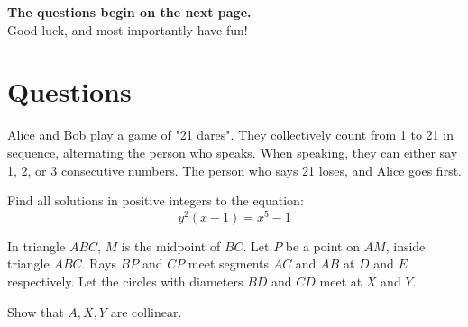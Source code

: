 \documentclass{exam}
\begin{document}
\centering

\textbf{The questions begin on the next page.}\\
\vspace{10pt}
Good luck, and most importantly have fun!



\newpage
\section*{Questions}
\vspace{20pt}

\begin{questions}
    \question[20]
    Alice and Bob play a game of "21 dares". They collectively count from 1 to 21 in sequence, alternating the person who speaks. When speaking, they can either say 1, 2, or 3 consecutive numbers. The person who says 21 loses, and Alice goes first.

    \question[40]
    Find all solutions in positive integers to the equation:
    \[ y^2(x-1) = x^5 - 1 \]

    \question[40]
    In triangle $ABC$, $M$ is the midpoint of $BC$. Let $P$ be a point on $AM$, inside triangle $ABC$.
    Rays $BP$ and $CP$ meet segments $AC$ and $AB$ at $D$ and $E$ respectively. Let the circles with diameters $BD$ and $CD$ meet at $X$ and $Y$.

    Show that $A, X, Y$ are collinear.


\end{questions}
\end{document}
